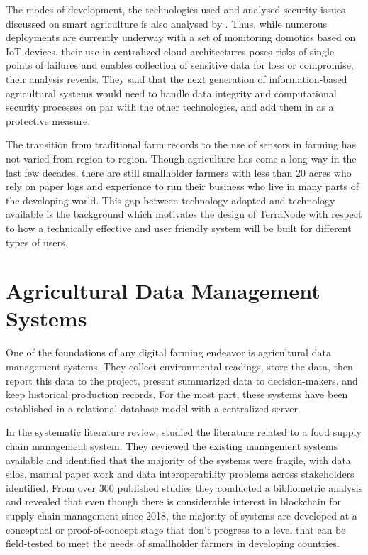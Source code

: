 The modes of development, the technologies used and analysed security issues discussed on smart agriculture is also analysed by \textcite{raj2022survey}. Thus, while numerous deployments are currently underway with a set of monitoring domotics based on IoT devices, their use in centralized cloud architectures poses risks of single points of failures and enables collection of sensitive data for loss or compromise, their analysis reveals. They said that the next generation of information-based agricultural systems would need to handle data integrity and computational security processes on par with the other technologies, and add them in as a protective measure.

The transition from traditional farm records to the use of sensors in farming has not varied from region to region. Though agriculture has come a long way in the last few decades, there are still smallholder farmers with less than 20 acres who rely on paper logs and experience to run their business who live in many parts of the developing world. This gap between technology adopted and technology available is the background which motivates the design of TerraNode with respect to how a technically effective and user friendly system will be built for different types of users.

\section{Agricultural Data Management Systems}

One of the foundations of any digital farming endeavor is agricultural data management systems. They collect environmental readings, store the data, then report this data to the project, present summarized data to decision-makers, and keep historical production records. For the most part, these systems have been established in a relational database model with a centralized server.

In the systematic literature review, \textcite{sharma2023blockchain} studied the literature related to a food supply chain management system. They reviewed the existing management systems available and identified that the majority of the systems were fragile, with data silos, manual paper work and data interoperability problems across stakeholders identified. From over 300 published studies they conducted a bibliometric analysis and revealed that even though there is considerable interest in blockchain for supply chain management since 2018, the majority of systems are developed at a conceptual or proof-of-concept stage that don't progress to a level that can be field-tested to meet the needs of smallholder farmers in developing countries.

